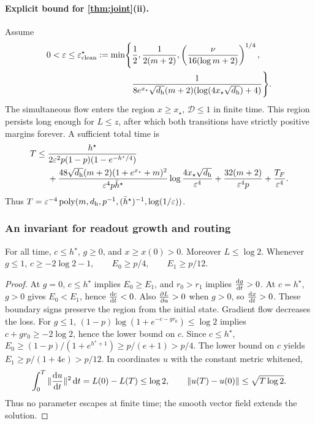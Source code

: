 \paragraph{Explicit bound for \cref{thm:joint}(ii).}
Assume
\begin{equation}
 \begin{aligned}
 0<\varepsilon\le\varepsilon^\star_{\mathrm{clean}}:=\min\Biggl\{&\frac12,\frac1{2(m+2)},
 \left(\frac{\nu}{16(\log m+2)}\right)^{1/4},\\
 &\frac1{8e^{x_\star}\sqrt{d_{\mathrm h}}(m+2)(\log(4x_\star\sqrt{d_{\mathrm h}})+4)}\Biggr\}.
 \end{aligned}
 \label{eq:CR-scale}
\end{equation}
The simultaneous flow enters the region $x\ge x_\star$, $\mathcal D\le1$ in finite time. This region persists long enough for $L\le z$, after which both transitions have strictly positive margins forever. A sufficient total time is
\begin{align}
 T\le{}&\frac{h^\star}{2\varepsilon^2 p(1-p)(1-e^{-h^\star/4})}\notag\\
 &+\frac{48\sqrt{d_{\mathrm h}}(m+2)(1+e^{x_\star}+m)^2}{\varepsilon^4p\bar h^\star}
       \log\frac{4x_\star\sqrt{d_{\mathrm h}}}{\varepsilon^4}
 +\frac{32(m+2)}{\varepsilon^4p}+\frac{T_F}{\varepsilon^4}.\label{eq:CR-time}
\end{align}
Thus $T=\varepsilon^{-4}\operatorname{poly}(m,d_{\mathrm h},p^{-1},(\bar h^\star)^{-1},\log(1/\varepsilon))$.

\subsubsection{An invariant for readout growth and routing}
\begin{lemma}
\label{lem:CR-align}
For all time, $c\le h^\star$, $g\ge0$, and $x\ge x(0)>0$. Moreover $L\le\log2$. Whenever $g\le1$,
 $c\ge-2\log2-1,\qquad E_0\ge p/4,\qquad E_1\ge p/12.$ 
\end{lemma}
\begin{proof}
At $g=0$, $c\le h^\star$ implies $E_0\ge E_1$, and $r_0>r_1$ implies $\ddt{g}>0$.
At $c=h^\star$, $g>0$ gives $E_0<E_1$, hence $\ddt{c}<0$. Also $\pd{L}{a}>0$ when $g>0$, so $\ddt{x}>0$.
These boundary signs preserve the region from the initial state. Gradient flow decreases the loss.
For $g\le1$, $(1-p)\log(1+e^{-c-gr_0})\le\log2$ implies $c+gr_0\ge-2\log2$, hence the lower bound on $c$.
Since $c\le h^\star$,
$E_0\ge(1-p)/(1+e^{h^\star+1})\ge p/(e+1)>p/4$.
The lower bound on $c$ yields $E_1\ge p/(1+4e)>p/12$.
In coordinates $u$ with the constant metric whitened,
\[
 \int_0^T\|\ddt{u}\|^2\,\mathrm d t=L(0)-L(T)\le\log2,\qquad
 \|u(T)-u(0)\|\le\sqrt{T\log2}.
\]
Thus no parameter escapes at finite time; the smooth vector field extends the solution.
\end{proof}

